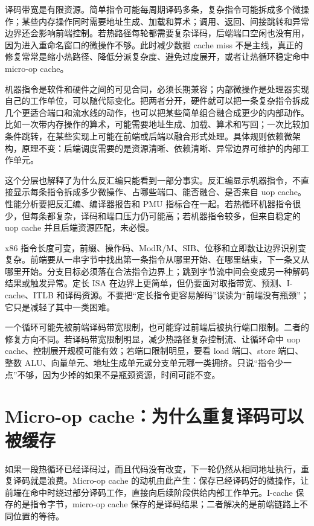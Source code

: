 译码带宽是有限资源。简单指令可能每周期译码多条，复杂指令可能拆成多个微操作；某些内存操作同时需要地址生成、加载和算术；调用、返回、间接跳转和异常边界还会影响前端控制。若热路径每轮都需要复杂译码，后端端口空闲也没有用，因为进入重命名窗口的微操作不够。此时减少数据 cache miss 不是主线，真正的修复常常是缩小热路径、降低分派复杂度、避免过度展开，或者让热循环稳定命中 micro-op cache。

机器指令是软件和硬件之间的可见合同，必须长期兼容；内部微操作是处理器实现自己的工作单位，可以随代际变化。把两者分开，硬件就可以把一条复杂指令拆成几个更适合端口和流水线的动作，也可以把某些简单组合融合成更少的内部动作。比如一次带内存操作的算术，可能需要地址生成、加载、算术和写回；一次比较加条件跳转，在某些实现上可能在前端或后端以融合形式处理。具体规则依赖微架构，原理不变：后端调度需要的是资源清晰、依赖清晰、异常边界可维护的内部工作单元。

这个分层也解释了为什么反汇编只能看到一部分事实。反汇编显示机器指令，不直接显示每条指令拆成多少微操作、占哪些端口、能否融合、是否来自 uop cache。性能分析要把反汇编、编译器报告和 PMU 指标合在一起。若热循环机器指令很少，但每条都复杂，译码和端口压力仍可能高；若机器指令较多，但来自稳定的 uop cache 并且后端资源匹配，未必慢。

x86 指令长度可变，前缀、操作码、ModR/M、SIB、位移和立即数让边界识别变复杂。前端要从一串字节中找出第一条指令从哪里开始、在哪里结束，下一条又从哪里开始。分支目标必须落在合法指令边界上；跳到字节流中间会变成另一种解码结果或触发异常。定长 ISA 在边界上更简单，但仍要面对取指带宽、预测、I-cache、ITLB 和译码资源。不要把“定长指令更容易解码”误读为“前端没有瓶颈”；它只是减轻了其中一类困难。

一个循环可能先被前端译码带宽限制，也可能穿过前端后被执行端口限制。二者的修复方向不同。若译码带宽限制明显，减少热路径复杂控制流、让循环命中 uop cache、控制展开规模可能有效；若端口限制明显，要看 load 端口、store 端口、整数 ALU、向量单元、地址生成单元或分支单元哪一类拥挤。只说“指令少一点”不够，因为少掉的如果不是瓶颈资源，时间可能不变。

\section{Micro-op cache：为什么重复译码可以被缓存}

如果一段热循环已经译码过，而且代码没有改变，下一轮仍然从相同地址执行，重复译码就是浪费。Micro-op cache 的动机由此产生：保存已经译码好的微操作，让前端在命中时绕过部分译码工作，直接向后续阶段供给内部工作单元。I-cache 保存的是指令字节，micro-op cache 保存的是译码结果；二者解决的是前端链路上不同位置的等待。

